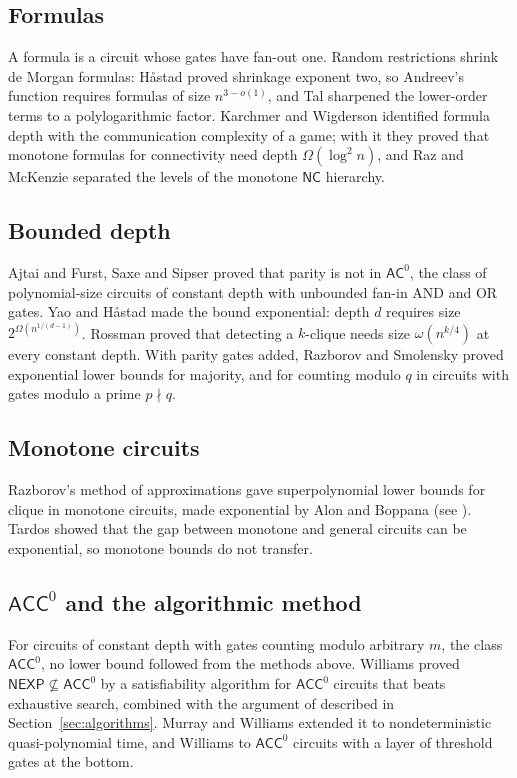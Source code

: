 \documentclass[11pt,reqno]{amsart}
\numberwithin{equation}{section}
\theoremstyle{plain}
\theoremstyle{definition}
\theoremstyle{remark}
\newcommand{\NEXP}{\mathsf{NEXP}}
\newcommand{\ACC}{\mathsf{ACC}^0}
\newcommand{\AC}{\mathsf{AC}^0}
\begin{document}
\subsection{Formulas}
A formula is a circuit whose gates have fan-out one. Random restrictions
shrink de Morgan formulas: H\aa stad \cite{Has98} proved shrinkage exponent
two, so Andreev's function requires formulas of size $n^{3-o(1)}$, and Tal
\cite{Tal14} sharpened the lower-order terms to a polylogarithmic factor.
Karchmer and Wigderson \cite{KW90} identified formula depth with the
communication complexity of a game; with it they proved that monotone formulas
for connectivity need depth $\Omega(\log^2 n)$, and Raz and McKenzie
\cite{RM99} separated the levels of the monotone $\mathsf{NC}$ hierarchy.

\subsection{Bounded depth}
Ajtai \cite{Ajt83} and Furst, Saxe and Sipser \cite{FSS84} proved that parity is
not in $\AC$, the class of polynomial-size circuits of constant depth with
unbounded fan-in AND and OR gates. Yao \cite{Yao85} and H\aa stad \cite{Has86}
made the bound exponential: depth $d$ requires size $2^{\Omega(n^{1/(d-1)})}$.
Rossman \cite{Ros08} proved that detecting a $k$-clique needs size
$\omega(n^{k/4})$ at every constant depth. With parity gates added, Razborov
\cite{Raz87} and Smolensky \cite{Smo87} proved exponential lower bounds for
majority, and for counting modulo $q$ in circuits with gates modulo a prime
$p\nmid q$.

\subsection{Monotone circuits}
Razborov's method of approximations gave superpolynomial lower bounds for
clique in monotone circuits, made exponential by Alon and Boppana \cite{AB87}
(see \cite[Chapter 9]{Juk12}). Tardos \cite{Tar88} showed that the gap between
monotone and general circuits can be exponential, so monotone bounds do not
transfer.

\subsection{$\ACC$ and the algorithmic method}
For circuits of constant depth with gates counting modulo arbitrary $m$, the
class $\ACC$, no lower bound followed from the methods above. Williams
\cite{Wil14} proved $\NEXP\not\subseteq\ACC$ by a satisfiability algorithm for
$\ACC$ circuits that beats exhaustive search, combined with the argument of
\cite{Wil13} described in Section~\ref{sec:algorithms}. Murray and Williams
\cite{MW20} extended it to nondeterministic quasi-polynomial time, and
Williams \cite{Wil14b} to $\ACC$ circuits with a layer of threshold gates at the
bottom.
\end{document}
